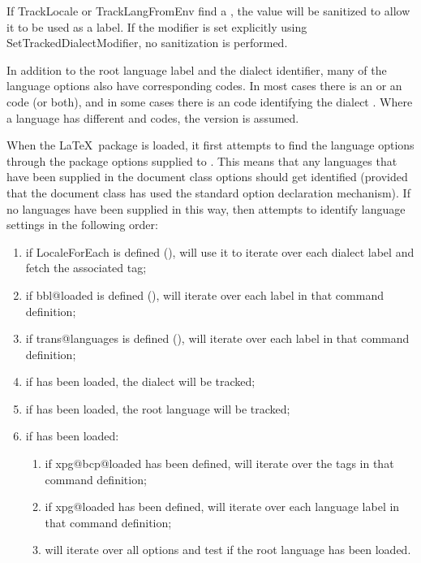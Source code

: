 \documentclass[titlepage=false,oneside,
 fontsize=12pt,captions=tableheading]{scrbook}
\begin{document}
\begin{important}
If \gls{TrackLocale} or \gls{TrackLangFromEnv} find a , the 
value will be sanitized to allow it to be used as a label. If the
modifier is set explicitly using \gls{SetTrackedDialectModifier}, 
no sanitization is performed.
\end{important}

In addition to the root language label and the dialect identifier,
many of the language options also have corresponding  codes. In
most cases there is an  or an  code (or both), and in some
cases there is an  code identifying the dialect .
Where a language has different  and  codes, 
the  version is assumed.

When the  \LaTeX\ package is loaded, it first attempts to find the
language options through the package options supplied to
. This means that any languages that have been
supplied in the document class options should get identified
(provided that the document class has used the standard option
declaration mechanism).  If no languages have been supplied in this
way,  then attempts to identify language settings in
the following order:
\begin{enumerate}
\item if \gls{LocaleForEach} is defined (),
 will use it to iterate over each dialect label
and fetch the associated  tag;

\item if \gls{bbl@loaded} is defined (), 
will iterate over each label in that command definition;

\item if \gls{trans@languages} is defined (), 
 will iterate over each label in that command
definition;

\item if  has been loaded, the  dialect
will be tracked;

\item if  has been loaded, the  root
language will be tracked;

\item if  has been loaded:

 \begin{enumerate}
 \item if \gls{xpg@bcp@loaded} has been defined, 
will iterate over the  tags in that command definition;

 \item if \gls{xpg@loaded} has been defined,  will
iterate over each language label in that command definition;

 \item {} will iterate over all  options
and test if the root language has been loaded.
 \end{enumerate}

\end{enumerate}
\end{document}
